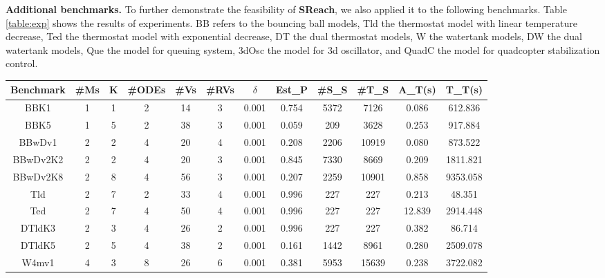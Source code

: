 {\noindent\bf Additional benchmarks.} To further demonstrate the feasibility of {\bf SReach}, we also applied it to the following benchmarks. 
Table \ref{table:exp} shows the results of experiments. BB refers to the bouncing ball models, 
Tld the thermostat model with linear temperature decrease, Ted the thermostat model with exponential decrease, 
DT the dual thermostat models, W the watertank models, DW the dual watertank models, 
Que the model for queuing system, 3dOsc the model for 3d oscillator, and QuadC the model for quadcopter 
stabilization control. 
\vspace{-.5cm}
\begin{table}[h!]
\captionsetup{font=scriptsize}
\centering
    \begin{tabular}{c|c|c|c|c|c|c|c|c|c|c|c}
    \hline
    Benchmark & \#Ms & K & \#ODEs & \#Vs & \#RVs & $\delta$ & Est\_P & \#S\_S & \#T\_S &  A\_T(s) & T\_T(s)  \\ \hline
    BBK1      & 1       & 1 & 2      & 14    & 3     & 0.001 & 0.754  & 5372      & 7126     & 0.086  & 612.836         \\ \hline
    BBK5      & 1       & 5 & 2      & 38    & 3     & 0.001 & 0.059  & 209       & 3628     & 0.253   &  917.884       \\ \hline
    BBwDv1    & 2       & 2 & 4      & 20    & 4     & 0.001 & 0.208  & 2206      & 10919    & 0.080   &  873.522     \\ \hline
    BBwDv2K2  & 2       & 2 & 4      & 20    & 3     & 0.001 & 0.845  & 7330      & 8669     & 0.209    & 1811.821      \\ \hline
    BBwDv2K8  & 2       & 8 & 4      & 56    & 3     & 0.001 & 0.207  & 2259      & 10901    & 0.858  & 9353.058        \\ \hline
    Tld       & 2       & 7 & 2      & 33     & 4     & 0.001 & 0.996      & 227         & 227        & 0.213     & 48.351         \\ \hline
    Ted       & 2       & 7 & 4      & 50     & 4     & 0.001 & 0.996      & 227         & 227       & 12.839   & 2914.448     \\ \hline
    DTldK3    & 2       & 3 & 4      & 26    & 2     & 0.001 & 0.996  & 227       & 227      & 0.382    & 86.714      \\ \hline
    DTldK5    & 2       & 5 & 4      & 38    & 2     & 0.001 & 0.161  & 1442      & 8961     & 0.280  &  2509.078       \\ \hline
    W4mv1       & 4       & 3 & 8      & 26     & 6     & 0.001 & 0.381      & 5953         & 15639        & 0.238   & 3722.082     \\ \hline

\end{tabular}
\end{table}
